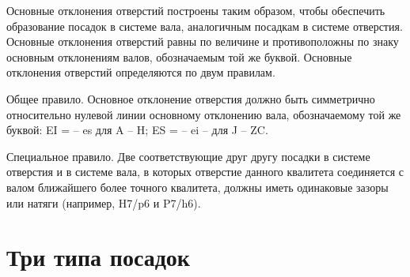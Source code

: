  Основные отклонения отверстий построены таким образом, чтобы обеспечить образование посадок в системе вала, аналогичным посадкам в системе отверстия. Основные отклонения отверстий равны по величине и противоположны по знаку основным отклонениям валов, обозначаемым той же буквой. Основные отклонения отверстий определяются по двум правилам.

Общее правило. Основное отклонение отверстия должно быть симметрично относительно нулевой линии основному отклонению вала, обозначаемому той же буквой: EI = – es для A – H; ES = – ei – для J – ZC.

Специальное правило. Две соответствующие друг другу посадки в системе отверстия и в системе вала, в которых отверстие данного квалитета соединяется с валом ближайшего более точного квалитета, должны иметь одинаковые зазоры или натяги (например, H7/p6 и P7/h6).

\section{Три типа посадок}

